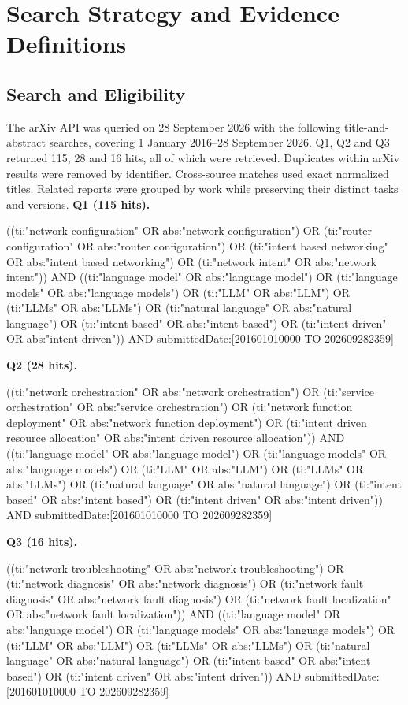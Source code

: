\section{Search Strategy and Evidence Definitions}\label{app:e0-protocol}
\subsection{Search and Eligibility}
The arXiv API was queried on 28 September 2026 with the following title-and-abstract searches, covering 1 January 2016--28 September 2026. Q1, Q2 and Q3 returned 115, 28 and 16 hits, all of which were retrieved. Duplicates within arXiv results were removed by identifier. Cross-source matches used exact normalized titles. Related reports were grouped by work while preserving their distinct tasks and versions.
\smallskip\noindent\textbf{Q1 (115 hits).}
\begingroup\footnotesize\ttfamily\raggedright
((ti:"network configuration" OR abs:"network configuration") OR (ti:"router configuration" OR abs:"router configuration") OR (ti:"intent based networking" OR abs:"intent based networking") OR (ti:"network intent" OR abs:"network intent")) AND ((ti:"language model" OR abs:"language model") OR (ti:"language models" OR abs:"language models") OR (ti:"LLM" OR abs:"LLM") OR (ti:"LLMs" OR abs:"LLMs") OR (ti:"natural language" OR abs:"natural language") OR (ti:"intent based" OR abs:"intent based") OR (ti:"intent driven" OR abs:"intent driven")) AND submittedDate:[201601010000 TO 202609282359]
\par\endgroup
\smallskip\noindent\textbf{Q2 (28 hits).}
\begingroup\footnotesize\ttfamily\raggedright
((ti:"network orchestration" OR abs:"network orchestration") OR (ti:"service orchestration" OR abs:"service orchestration") OR (ti:"network function deployment" OR abs:"network function deployment") OR (ti:"intent driven resource allocation" OR abs:"intent driven resource allocation")) AND ((ti:"language model" OR abs:"language model") OR (ti:"language models" OR abs:"language models") OR (ti:"LLM" OR abs:"LLM") OR (ti:"LLMs" OR abs:"LLMs") OR (ti:"natural language" OR abs:"natural language") OR (ti:"intent based" OR abs:"intent based") OR (ti:"intent driven" OR abs:"intent driven")) AND submittedDate:[201601010000 TO 202609282359]
\par\endgroup
\smallskip\noindent\textbf{Q3 (16 hits).}
\begingroup\footnotesize\ttfamily\raggedright
((ti:"network troubleshooting" OR abs:"network troubleshooting") OR (ti:"network diagnosis" OR abs:"network diagnosis") OR (ti:"network fault diagnosis" OR abs:"network fault diagnosis") OR (ti:"network fault localization" OR abs:"network fault localization")) AND ((ti:"language model" OR abs:"language model") OR (ti:"language models" OR abs:"language models") OR (ti:"LLM" OR abs:"LLM") OR (ti:"LLMs" OR abs:"LLMs") OR (ti:"natural language" OR abs:"natural language") OR (ti:"intent based" OR abs:"intent based") OR (ti:"intent driven" OR abs:"intent driven")) AND submittedDate:[201601010000 TO 202609282359]
